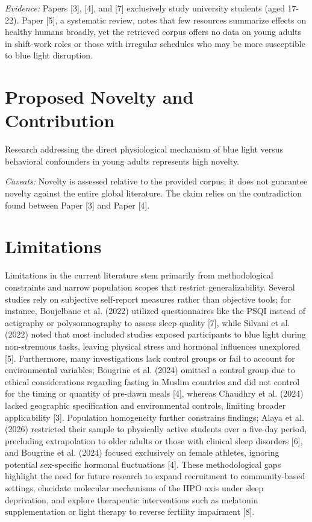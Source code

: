 \documentclass[conference]{IEEEtran}
\begin{document}
\textit{Evidence:} Papers [3], [4], and [7] exclusively study university students (aged 17-22). Paper [5], a systematic review, notes that few resources summarize effects on healthy humans broadly, yet the retrieved corpus offers no data on young adults in shift-work roles or those with irregular schedules who may be more susceptible to blue light disruption.

\section{Proposed Novelty and Contribution}
Research addressing the direct physiological mechanism of blue light versus behavioral confounders in young adults represents high novelty.

\textit{Caveats:} Novelty is assessed relative to the provided corpus; it does not guarantee novelty against the entire global literature. The claim relies on the contradiction found between Paper [3] and Paper [4].

\section{Limitations}
Limitations in the current literature stem primarily from methodological constraints and narrow population scopes that restrict generalizability. Several studies rely on subjective self-report measures rather than objective tools; for instance, Boujelbane et al. (2022) utilized questionnaires like the PSQI instead of actigraphy or polysomnography to assess sleep quality [7], while Silvani et al. (2022) noted that most included studies exposed participants to blue light during non-strenuous tasks, leaving physical stress and hormonal influences unexplored [5]. Furthermore, many investigations lack control groups or fail to account for environmental variables; Bougrine et al. (2024) omitted a control group due to ethical considerations regarding fasting in Muslim countries and did not control for the timing or quantity of pre-dawn meals [4], whereas Chaudhry et al. (2024) lacked geographic specification and environmental controls, limiting broader applicability [3]. Population homogeneity further constrains findings; Alaya et al. (2026) restricted their sample to physically active students over a five-day period, precluding extrapolation to older adults or those with clinical sleep disorders [6], and Bougrine et al. (2024) focused exclusively on female athletes, ignoring potential sex-specific hormonal fluctuations [4]. These methodological gaps highlight the need for future research to expand recruitment to community-based settings, elucidate molecular mechanisms of the HPO axis under sleep deprivation, and explore therapeutic interventions such as melatonin supplementation or light therapy to reverse fertility impairment [8].
\end{document}

